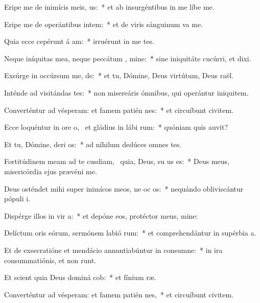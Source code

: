 \item Eripe me de inimícis meis,  us:~* et ab insurgéntibus in me líbe me.
\item Eripe me de operántibus intem:~* et de viris sánguinum va me.
\item Quia ecce cepérunt á am:~* irruérunt in me tes.
\item Neque iníquitas mea, neque peccátum , mine:~* sine iniquitáte cucúrri, et dixi.
\item Exsúrge in occúrsum me,  de:~* et tu, Dómine, Deus virtútum, Deus raël.
\item Inténde ad visitándas  tes:~* non misereáris ómnibus, qui operántur iniquitem.
\item Converténtur ad vésperam: et famem patién  nes:~* et circuíbunt civitem.
\item Ecce loquéntur in ore o,~\pscross{} et gládius in lábi rum:~* quóniam quis auvit?
\item Et tu, Dómine, deri os:~* ad níhilum dedúces omnes tes.
\item Fortitúdinem meam ad te cusdiam,~\pscross{} quia, Deus, su us es:~* Deus meus, misericórdia ejus prævéni me.
\item Deus osténdet mihi super inimícos meos, ne oc os:~* nequándo obliviscántur pópuli i.
\item Dispérge illos in vir a:~* et depóne eos, protéctor meus, mine:
\item Delíctum oris eórum, sermónem labió rum:~* et comprehendántur in supérbia a.
\item Et de exsecratióne et mendácio annuntiabúntur in consumne:~* in ira consummatiónis, et non runt.
\item Et scient quia Deus dominá cob:~* et fínium ræ.
\item Converténtur ad vésperam: et famem patién  nes,~* et circuíbunt civitem.
